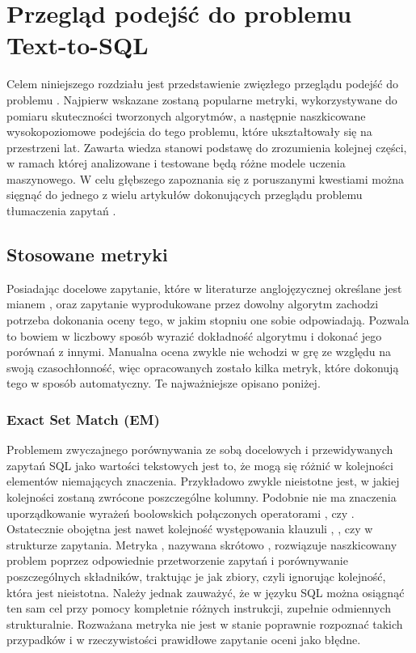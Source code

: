 \chapter{Przegląd podejść do problemu Text-to-SQL}
Celem niniejszego rozdziału jest przedstawienie zwięzłego przeglądu podejść do problemu . Najpierw wskazane zostaną popularne metryki, wykorzystywane do pomiaru skuteczności tworzonych algorytmów, a następnie naszkicowane wysokopoziomowe podejścia do tego problemu, które ukształtowały się na przestrzeni lat. Zawarta wiedza stanowi podstawę do zrozumienia kolejnej części, w ramach której analizowane i testowane będą różne modele uczenia maszynowego. W celu głębszego zapoznania się z poruszanymi kwestiami można sięgnąć do jednego z wielu artykułów dokonujących przeglądu problemu tłumaczenia zapytań .

\section{Stosowane metryki}
\label{section:metrics}
Posiadając docelowe zapytanie, które w literaturze anglojęzycznej określane jest mianem , oraz zapytanie wyprodukowane przez dowolny algorytm zachodzi potrzeba dokonania oceny tego, w jakim stopniu one sobie odpowiadają. Pozwala to bowiem w liczbowy sposób wyrazić dokładność algorytmu i dokonać jego porównań z innymi. Manualna ocena zwykle nie wchodzi w grę ze względu na swoją czasochłonność, więc opracowanych zostało kilka metryk, które dokonują tego w sposób automatyczny. Te najważniejsze opisano poniżej.

\subsection{Exact Set Match (EM)}
Problemem zwyczajnego porównywania ze sobą docelowych i przewidywanych zapytań SQL jako wartości tekstowych jest to, że mogą się różnić w kolejności elementów niemających znaczenia. Przykładowo zwykle nieistotne jest, w jakiej kolejności zostaną zwrócone poszczególne kolumny. Podobnie nie ma znaczenia uporządkowanie wyrażeń boolowskich połączonych operatorami , czy . Ostatecznie obojętna jest nawet kolejność występowania klauzuli , , czy  w strukturze zapytania. Metryka , nazywana skrótowo , rozwiązuje naszkicowany problem poprzez odpowiednie przetworzenie zapytań i porównywanie poszczególnych składników, traktując je jak zbiory, czyli ignorując kolejność, która jest nieistotna. Należy jednak zauważyć, że w języku SQL można osiągnąć ten sam cel przy pomocy kompletnie różnych instrukcji, zupełnie odmiennych strukturalnie. Rozważana metryka nie jest w stanie poprawnie rozpoznać takich przypadków i w rzeczywistości prawidłowe zapytanie oceni jako błędne.

